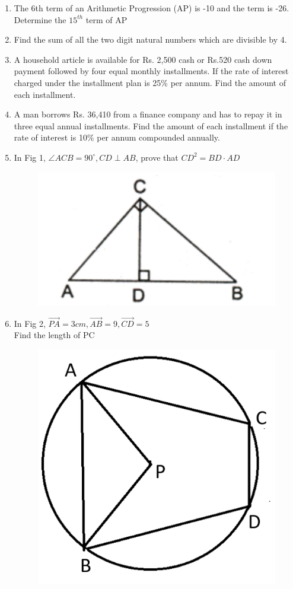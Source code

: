 \documentclass[journal,12pt,twocolumn]{IEEEtran}
\begin{document}
\begin{enumerate}[label=1.\arabic*]
\item The 6th term of an Arithmetic Progression (AP) is -10 and the term is -26. Determine the $15^{th}$ term of AP\\
\item Find the sum of all the two digit natural numbers which are divisible by 4.\\
\item A household article is available for Rs. 2,500 cash or Rs.520 cash down payment followed by four equal monthly installments.
If the rate of interest charged under the installment plan is 25\% per annum. Find the amount of each installment.\\
\item A man borrows Rs. 36,410 from a finance company and has to repay it in three equal annual installments. Find the amount of each
installment if the rate of interest is 10\% per annum compounded annually.\\
\item In Fig 1, $\angle{ACB} = 90^\circ , CD \perp AB $, prove that $CD^2 = BD \cdot AD $\\

\begin{figure}[h!]
\centering
\includegraphics[width=0.5\columnwidth,center,]{fig 1.1}\\
\caption{}
\label{fig1}
\end{figure}

\vspace{2mm}
\item In Fig 2, $\vec{PA} = 3cm, \vec{AB} = 9, \vec{CD} = 5$\\
Find the length of PC\\

\begin{figure}[h!]
\centering
\includegraphics[width=0.5\columnwidth,center]{fig 1.2}\\
\caption{}
\label{Fig 2}
\end{figure}


\end{enumerate}
\end{document}
